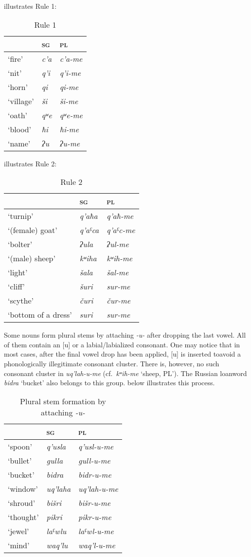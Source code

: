 ﻿\documentclass[output=paper]{langsci/langscibook}
\begin{document}
 illustrates Rule 1:

\begin{table}[H]
  \caption{Rule 1}\label{tab:3:19}
  
\begin{tabular}{@{}lll@{}}
\toprule
& \textsc{sg} & \textsc{pl}\tabularnewline \midrule
`fire' & \emph{c'a} & \emph{c'a-me}\tabularnewline
`nit' & \emph{q'i} & \emph{q'i-me}\tabularnewline
`horn' & \emph{qi} & \emph{qi-me}\tabularnewline
`village' & \emph{ši} & \emph{ši-me}\tabularnewline
`oath' & \emph{qʷe} & \emph{qʷe-me}\tabularnewline
`blood' & \emph{ħi} & \emph{ħi-me}\tabularnewline
`name' & \emph{ʔu} & \emph{ʔu-me}\tabularnewline
\bottomrule
\end{tabular}
\end{table}

 illustrates Rule 2:

\begin{table}[H]
  \caption{Rule 2}\label{tab:3:20}
\begin{tabular}{@{}lll@{}}
\toprule
& \textsc{sg} & \textsc{pl}\tabularnewline \midrule
`turnip' & \emph{q'aħa} & \emph{q'aħ-me}\tabularnewline
`(female) goat' & \emph{q'aˤca} & \emph{q'aˤc-me}\tabularnewline
`bolter' & \emph{ʔula} & \emph{ʔul-me}\tabularnewline
`(male) sheep' & \emph{kʷiha} & \emph{kʷih-me}\tabularnewline
`light' & \emph{šala} & \emph{šal-me}\tabularnewline
`cliff' & \emph{šuri} & \emph{sur-me}\tabularnewline
`scythe' & \emph{čuri} & \emph{čur-me}\tabularnewline
`bottom of a dress' & \emph{suri} & \emph{sur-me}\tabularnewline
\bottomrule
\end{tabular}
\end{table}

Some nouns form plural stems by attaching \emph{-u-} after dropping the
last vowel. All of them contain an [u] or a labial/labialized
consonant. One may notice that in most cases, after the final vowel drop
has been applied, [u] is inserted to\pagebreak[3] avoid a phonologically
illegitimate consonant cluster.
There is, however, no such consonant cluster in \emph{uq'lah-u-me} (cf.\
\emph{kʷih-me} `sheep, PL'). The Russian loanword \emph{bidra} `bucket' also
belongs to this group. \tabref{tab:3:21} below illustrates this process.

\begin{table}[h]
  \caption{Plural stem formation by attaching \emph{-u-}}\label{tab:3:21}
\begin{tabular}{@{}lll@{}}
\toprule
& \textsc{sg} & \textsc{pl}\tabularnewline\midrule
`spoon' & \emph{q'usla} & \emph{q'usl-u-me}\tabularnewline
`bullet' & \emph{gulla} & \emph{gull-u-me}\tabularnewline
`bucket' & \emph{bidra} & \emph{bidr-u-me}\tabularnewline
`window' & \emph{uq'laha} & \emph{uq'lah-u-me}\tabularnewline
`shroud' & \emph{bišri} & \emph{bišr-u-me}\tabularnewline
`thought' & \emph{pikri} & \emph{pikr-u-me}\tabularnewline
`jewel' & \emph{laˤwlu} & \emph{laˤwl-u-me}\tabularnewline
`mind' & \emph{waq'lu} & \emph{waq'l-u-me}\tabularnewline
\bottomrule
\end{tabular}
\end{table}
\end{document}
